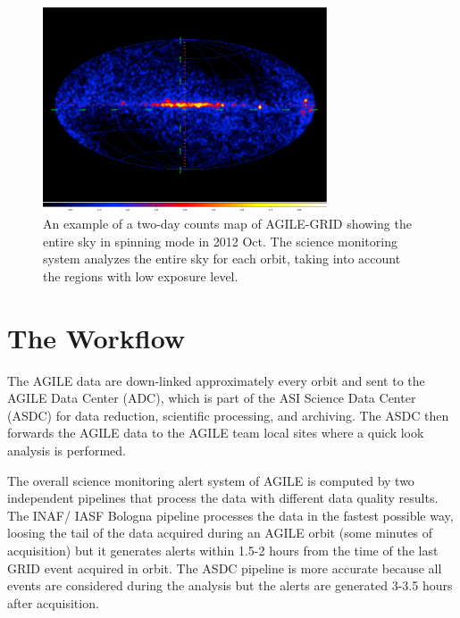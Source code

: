 \begin{figure}[t]
\centering
\includegraphics[width=0.75\textwidth]{part10/Bulgarelli_O05/O.05_1c.eps}
\caption{An example of a two-day counts map of AGILE-GRID showing the entire sky in spinning mode in 2012 Oct. The science monitoring system analyzes the entire sky for each orbit, taking into account the regions with low exposure level.} \label{fig_fov}
\end{figure}

\section{The Workflow}

The AGILE data are down-linked approximately every orbit and sent to the AGILE Data Center (ADC), which is part of the ASI Science Data Center (ASDC) for data reduction, scientific processing, and archiving. The ASDC then forwards the AGILE data to the AGILE team local sites where a quick look analysis is performed.

The overall science monitoring alert system of AGILE is computed by two independent pipelines that process the data with different data quality results. The INAF/ IASF Bologna pipeline processes the data in the fastest possible way, loosing the tail of the data acquired during an AGILE orbit (some minutes of acquisition) but it generates alerts within 1.5-2 hours from the time of the last GRID event acquired in orbit. The ASDC pipeline is more accurate because all events are considered during the analysis but the alerts are generated 3-3.5 hours after acquisition.

